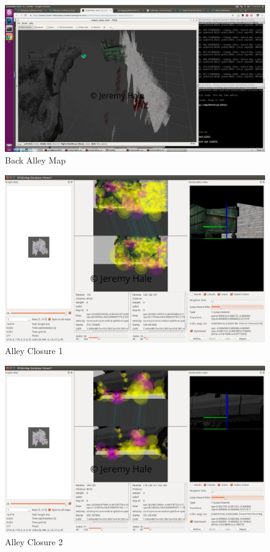 \documentclass[10pt,journal,compsoc]{IEEEtran}
\begin{document}
\begin{figure}
    \centering
    \includegraphics[width=\linewidth]{alley_confused}
    \caption{Back Alley Map}
    \label{fig:alley_3d}
\end{figure}

\begin{figure}
    \centering
    \includegraphics[width=\linewidth]{alley_closure_1}
    \caption{Alley Closure 1}
    \label{fig:alley_closure_1}
\end{figure}

\begin{figure}
    \centering
    \includegraphics[width=\linewidth]{alley_closure_2}
    \caption{Alley Closure 2}
    \label{fig:alley_closure_2}
\end{figure}
\end{document}
